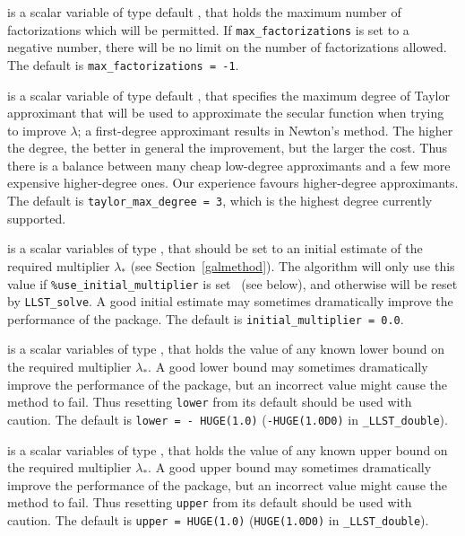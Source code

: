 \documentclass{galahad}
\newcommand{\packagename}{LLST}
\newcommand{\fullpackagename}{\libraryname\_\packagename}
\begin{document}
\begin{description}
 is a scalar variable of type default \integer, 
that holds the maximum number of factorizations which will be permitted.
If {\tt max\_factorizations} is set to a negative number, there will be
no limit on the number of factorizations allowed.
The default is {\tt max\_factorizations = -1}.

 is a scalar variable of type default \integer, 
that specifies the maximum degree of Taylor approximant that will be used
to approximate the secular function when trying to improve $\lambda$;
a first-degree approximant results in Newton's method.
The higher the degree, the better in general the improvement, but the larger the
cost. Thus there is a balance between many cheap low-degree approximants
and a few more expensive higher-degree ones. Our experience favours 
higher-degree approximants.
The default is {\tt taylor\_max\_degree = 3}, which is the highest degree
currently supported.

 is a scalar variables of type \realdp, that should 
be set to an initial estimate of the required multiplier $\lambda_*$
(see Section~\ref{galmethod}). The algorithm will only use this value
if {\tt \%use\_initial\_multiplier} is set \true\ (see below), and otherwise 
will be reset by {\tt \packagename\_solve}. A good initial estimate 
may sometimes dramatically improve the performance of the package.
The default is {\tt initial\_multiplier = 0.0}.

 is a scalar variables of type \realdp, that holds the value
of any known lower bound on the required multiplier $\lambda_*$. A good lower
bound may sometimes dramatically improve the performance of the package, but
an incorrect value might cause the method to fail. Thus resetting
{\tt lower} from its default should be used with caution. 
The default is {\tt lower = - HUGE(1.0)}
({\tt -HUGE(1.0D0)} in {\tt \fullpackagename\_double}).

 is a scalar variables of type \realdp, that holds the value
of any known upper bound on the required multiplier $\lambda_*$. A good upper
bound may sometimes dramatically improve the performance of the package, but
an incorrect value might cause the method to fail. Thus resetting
{\tt upper} from its default should be used with caution. 
The default is {\tt upper = HUGE(1.0)}
({\tt HUGE(1.0D0)} in {\tt \fullpackagename\_double}).


\end{description}
\end{document}
